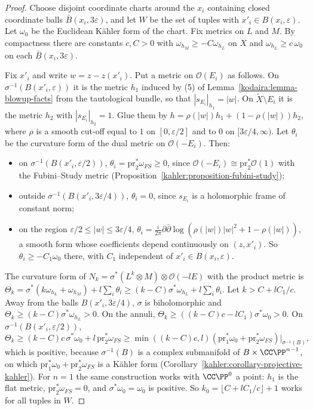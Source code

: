 \begin{proof}
Choose disjoint coordinate charts around the $x_i$ containing closed coordinate balls $\bar B(x_i, 3\varepsilon)$, and let $W$ be the set of tuples with
$x'_i \in B(x_i, \varepsilon)$. Let $\omega_0$ be the Euclidean K\"ahler form of the chart. Fix metrics on $L$ and $M$. By compactness there are
constants $c, C > 0$ with $\omega_{h_M} \geq -C\omega_{h_L}$ on $X$ and $\omega_{h_L} \geq c\,\omega_0$ on each $\bar B(x_i, 3\varepsilon)$.

Fix $x'_i$ and write $w = z - z(x'_i)$. Put a metric on $\mathcal{O}(E_i)$ as follows. On $\sigma^{-1}(B(x'_i, \varepsilon))$ it is the metric $h_1$
induced by (5) of Lemma~\ref{kodaira:lemma-blowup-facts} from the tautological bundle, so that $|s_{E_i}|_{h_1} = |w|$. On $\tilde X \setminus E_i$ it is
the metric $h_2$ with $|s_{E_i}|_{h_2} = 1$. Glue them by $h = \rho(|w|)h_1 + (1 - \rho(|w|))h_2$, where $\rho$ is a smooth cut-off equal to $1$ on
$[0, \varepsilon/2]$ and to $0$ on $[3\varepsilon/4, \infty)$. Let $\theta_i$ be the curvature form of the dual metric on $\mathcal{O}(-E_i)$. Then:
\begin{itemize}
\item on $\sigma^{-1}(B(x'_i, \varepsilon/2))$, $\theta_i = \mathrm{pr}_2^*\omega_{FS} \geq 0$, since $\mathcal{O}(-E_i) \cong \mathrm{pr}_2^*\mathcal{O}(1)$ with the
Fubini--Study metric (Proposition~\ref{kahler:proposition-fubini-study});
\item outside $\sigma^{-1}(B(x'_i, 3\varepsilon/4))$, $\theta_i = 0$, since $s_{E_i}$ is a holomorphic frame of constant norm;
\item on the region $\varepsilon/2 \leq |w| \leq 3\varepsilon/4$, $\theta_i = \frac{i}{2\pi}\partial\bar\partial\log\left(\rho(|w|)|w|^2 + 1 - \rho(|w|)\right)$, a
smooth form whose coefficients depend continuously on $(z, x'_i)$. So $\theta_i \geq -C_1\omega_0$ there, with $C_1$ independent of
$x'_i \in B(x_i, \varepsilon)$.
\end{itemize}
The curvature form of $N_k = \sigma^*(L^k \otimes M) \otimes \mathcal{O}(-lE)$ with the product metric is
$\Theta_k = \sigma^*(k\omega_{h_L} + \omega_{h_M}) + l\sum_i\theta_i \geq (k - C)\sigma^*\omega_{h_L} + l\sum_i\theta_i$. Let $k > C + lC_1/c$. Away from the
balls $B(x'_i, 3\varepsilon/4)$, $\sigma$ is biholomorphic and $\Theta_k \geq (k - C)\sigma^*\omega_{h_L} > 0$. On the annuli,
$\Theta_k \geq ((k - C)c - lC_1)\sigma^*\omega_0 > 0$. On $\sigma^{-1}(B(x'_i, \varepsilon/2))$,
\[
\Theta_k \geq (k - C)c\,\sigma^*\omega_0 + l\,\mathrm{pr}_2^*\omega_{FS} \geq \min((k - C)c, l)\left(\mathrm{pr}_1^*\omega_0 + \mathrm{pr}_2^*\omega_{FS}\right)\big|_{\sigma^{-1}(B)} ,
\]
which is positive, because $\sigma^{-1}(B)$ is a complex submanifold of $B \times \CC\PP^{n-1}$, on which $\mathrm{pr}_1^*\omega_0 + \mathrm{pr}_2^*\omega_{FS}$ is a
K\"ahler form (Corollary~\ref{kahler:corollary-projective-kahler}). For $n = 1$ the same construction works with $\CC\PP^0$ a point: $h_1$ is the
flat metric, $\mathrm{pr}_2^*\omega_{FS} = 0$, and $\sigma^*\omega_0 = \omega_0$ is positive. So $k_0 = \lfloor C + lC_1/c\rfloor + 1$ works for all
tuples in $W$.
\end{proof}

